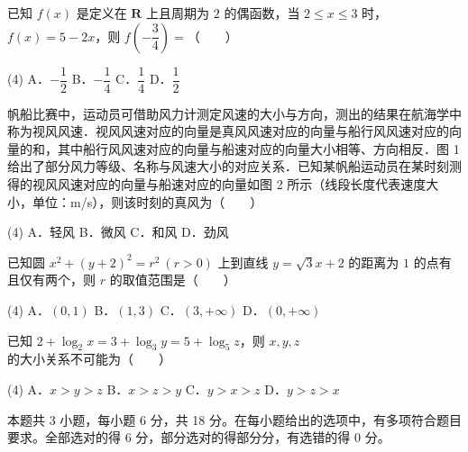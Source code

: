 \begin{question}
已知 $f(x)$ 是定义在 $\mathbf{R}$ 上且周期为 $2$ 的偶函数，当 $2\le x\le 3$ 时，$f(x)=5-2x$，则 $f\left(-\dfrac34\right)=$\mbox{（　　）}

\begin{gkopts}(4)
\task A．$-\dfrac12$
\task B．$-\dfrac14$
\task C．$\dfrac14$
\task D．$\dfrac12$
\end{gkopts}

\Needspace{0.4\textheight}
\end{question}
\begin{question}
帆船比赛中，运动员可借助风力计测定风速的大小与方向，测出的结果在航海学中称为视风风速．视风风速对应的向量是真风风速对应的向量与船行风风速对应的向量的和，其中船行风风速对应的向量与船速对应的向量大小相等、方向相反．图 1 给出了部分风力等级、名称与风速大小的对应关系．已知某帆船运动员在某时刻测得的视风风速对应的向量与船速对应的向量如图 2 所示（线段长度代表速度大小，单位：m/s），则该时刻的真风为\mbox{（　　）}
\nopagebreak[4]
\begin{center}\end{center}
\nopagebreak[4]
\begin{gkopts}(4)
\task A．轻风
\task B．微风
\task C．和风
\task D．劲风
\end{gkopts}

\end{question}
\begin{question}
已知圆 $x^2+(y+2)^2=r^2\ (r>0)$ 上到直线 $y=\sqrt3x+2$ 的距离为 $1$ 的点有且仅有两个，则 $r$ 的取值范围是\mbox{（　　）}

\begin{gkopts}(4)
\task A．$(0,1)$
\task B．$(1,3)$
\task C．$(3,+\infty)$
\task D．$(0,+\infty)$
\end{gkopts}

\end{question}
\begin{question}
已知 $2+\log_2 x=3+\log_3 y=5+\log_5 z$，则 $x,y,z$ 的大小关系不可能为\mbox{（　　）}

\begin{gkopts}(4)
\task A．$x>y>z$
\task B．$x>z>y$
\task C．$y>x>z$
\task D．$y>z>x$
\end{gkopts}

\par\medskip

\end{question}

\begin{gktip}
本题共 3 小题，每小题 6 分，共 18 分。在每小题给出的选项中，有多项符合题目要求。全部选对的得 6 分，部分选对的得部分分，有选错的得 0 分。
\end{gktip}

